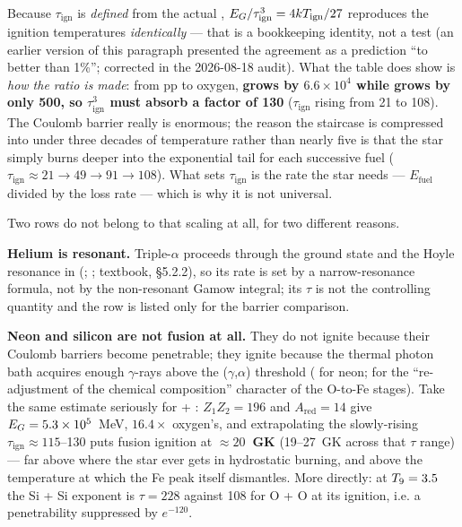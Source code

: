 Because $\tau_{\mathrm{ign}}$ is \emph{defined} from the actual \Tign,
$E_{G}/\tau_{\mathrm{ign}}^3 = 4kT_{\mathrm{ign}}/27$ reproduces the ignition temperatures
\emph{identically} --- that is a bookkeeping identity, not a test (an earlier
version of this paragraph presented the agreement as a prediction ``to better
than 1\%''; corrected in the 2026-08-18 audit). What the table does show is
\emph{how the ratio is made}: from pp to oxygen, \textbf{\EG{} grows by
$6.6 \times 10^4$ while \Tign{} grows by only 500, so $\tau_{\mathrm{ign}}^3$
must absorb a factor of 130} ($\tau_{\mathrm{ign}}$ rising from 21 to 108). The
Coulomb barrier really is enormous; the reason the staircase is compressed into
under three decades of temperature rather than nearly five is that the star
simply burns deeper into the exponential tail for each successive fuel
($\tau_{\mathrm{ign}} \approx 21 \to 49 \to 91 \to 108$). What sets
$\tau_{\mathrm{ign}}$ is the rate the star needs --- $E_{\mathrm{fuel}}$ divided
by the loss rate --- which is why it is not universal.

Two rows do not belong to that scaling at all, for two different reasons.

\textbf{Helium is resonant.} Triple-$\alpha$ proceeds through the 
ground state and the Hoyle resonance in  (\citealt{salpeter1952};
\citealt{hoyle1954}; textbook, \citealt{iliadis2015} \S5.2.2), so its rate is
set by a narrow-resonance formula, not by the non-resonant Gamow integral; its
$\tau$ is not the controlling quantity and the row is listed only for the
barrier comparison.

\textbf{Neon and silicon are not fusion at all.} They do not ignite because
their Coulomb barriers become penetrable; they ignite because the thermal photon
bath acquires enough $\gamma$-rays above the ($\gamma$,$\alpha$) threshold
(\citealt{kato2020} for neon; \citealt{boccioli2024} for the ``re-adjustment of
the chemical composition'' character of the O-to-Fe stages). Take the same
estimate seriously for  + : $Z_1Z_2 = 196$ and
$A_{\mathrm{red}} = 14$ give $E_{G} = 5.3 \times 10^5$~MeV, $16.4\times$
oxygen's, and extrapolating the slowly-rising
$\tau_{\mathrm{ign}} \approx 115$--130 puts fusion ignition at
\textbf{${\approx}20$~GK} (19--27~GK across that $\tau$ range) --- far above
where the star ever gets in hydrostatic burning, and above the temperature at
which the Fe peak itself dismantles. More directly: at $T_{9} = 3.5$ the Si + Si
exponent is $\tau = 228$ against 108 for O + O at its ignition, i.e. a
penetrability suppressed by $e^{-120}$.

